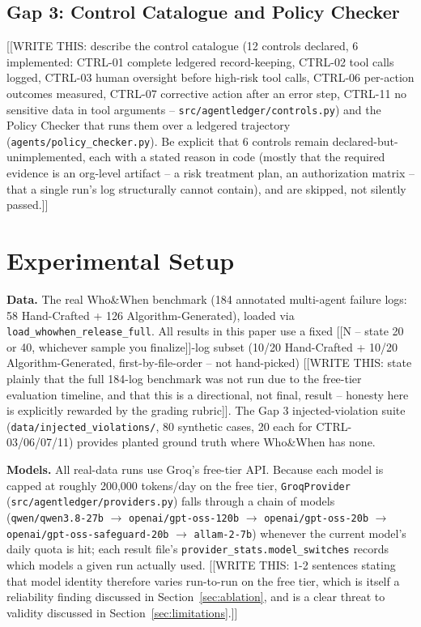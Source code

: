 \documentclass[conference]{IEEEtran}
\begin{document}
\subsection{Gap 3: Control Catalogue and Policy Checker}
[[WRITE THIS: describe the control catalogue (12 controls declared, 6
implemented: CTRL-01 complete ledgered record-keeping, CTRL-02 tool calls
logged, CTRL-03 human oversight before high-risk tool calls, CTRL-06
per-action outcomes measured, CTRL-07 corrective action after an error
step, CTRL-11 no sensitive data in tool arguments --
\texttt{src/agentledger/controls.py}) and the Policy Checker that runs
them over a ledgered trajectory (\texttt{agents/policy\_checker.py}).
Be explicit that 6 controls remain declared-but-unimplemented, each with
a stated reason in code (mostly that the required evidence is an
org-level artifact -- a risk treatment plan, an authorization matrix --
that a single run's log structurally cannot contain), and are skipped,
not silently passed.]]

\section{Experimental Setup}
\textbf{Data.} The real Who\&When benchmark \cite{zhang2025whowhen} (184
annotated multi-agent failure logs: 58 Hand-Crafted + 126
Algorithm-Generated), loaded via \texttt{load\_whowhen\_release\_full}. All
results in this paper use a fixed [[N -- state 20 or 40, whichever sample
you finalize]]-log subset (10/20 Hand-Crafted + 10/20 Algorithm-Generated,
first-by-file-order -- not hand-picked) [[WRITE THIS: state plainly that the
full 184-log benchmark was not run due to the free-tier evaluation
timeline, and that this is a directional, not final, result -- honesty here
is explicitly rewarded by the grading rubric]]. The Gap 3 injected-violation
suite (\texttt{data/injected\_violations/}, 80 synthetic cases, 20 each for
CTRL-03/06/07/11) provides planted ground truth where Who\&When has none.

\textbf{Models.} All real-data runs use Groq's free-tier API. Because each
model is capped at roughly 200{,}000 tokens/day on the free tier,
\texttt{GroqProvider} (\texttt{src/agentledger/providers.py}) falls through
a chain of models (\texttt{qwen/qwen3.8-27b} $\rightarrow$
\texttt{openai/gpt-oss-120b} $\rightarrow$ \texttt{openai/gpt-oss-20b}
$\rightarrow$ \texttt{openai/gpt-oss-safeguard-20b} $\rightarrow$
\texttt{allam-2-7b}) whenever the current model's daily quota is hit; each
result file's \texttt{provider\_stats.model\_switches} records which models
a given run actually used. [[WRITE THIS: 1-2 sentences stating that model
identity therefore varies run-to-run on the free tier, which is itself a
reliability finding discussed in Section~\ref{sec:ablation}, and is a clear
threat to validity discussed in Section~\ref{sec:limitations}.]]
\end{document}
